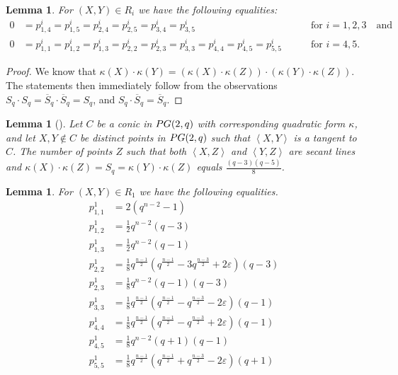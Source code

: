 \documentclass[a4paper]{article}
\newtheorem{lm}[thm]{Lemma}
\theoremstyle{definition}
\newcommand{\eps}{\varepsilon}
\newcommand{\vspan}[1]{\left \langle #1 \right \rangle}
\newcommand{\pg}{\textnormal{PG}}
\newcommand{\ns}{\overline S}
\begin{document}
\begin{lm}
 \label{LmIntersectionNumbersEqualToZero}
    For $(X,Y)\in R_{i}$ we have the following equalities:
    \begin{align*}
        0&=p^{i}_{1,4}=p^{i}_{1,5}=p^{i}_{2,4}=p^{i}_{2,5}=p^{i}_{3,4}=p^{i}_{3,5}&&\text{ for } i=1,2,3\quad \text{and}\\
        0&=p^{i}_{1,1}=p^{i}_{1,2}=p^{i}_{1,3}=p^{i}_{2,2}=p^{i}_{2,3}=p^{i}_{3,3}=p^{i}_{4,4}=p^{i}_{4,5}=p^{i}_{5,5}\quad&&\text{ for } i=4,5.
    \end{align*}
\end{lm}
\begin{proof}
    We know that $\kappa(X)\cdot\kappa(Y)=(\kappa(X)\cdot \kappa(Z))\cdot(\kappa(Y)\cdot\kappa(Z))$. The statements then immediately follow from the observations $S_q \cdot S_q = \ns_q \cdot \ns_q = S_q$, and $S_q \cdot \ns_q = \ns_q$.
\end{proof}

\begin{lm}[{\cite[\S 12.2, p.\ 380]{bcn}}]
 \label{lem:p122}
    Let $C$ be a conic in $\pg(2,q)$ with corresponding quadratic form $\kappa$, and let $X,Y\notin C$ be distinct points in $\pg(2,q)$ such that $\vspan{X,Y}$ is a tangent to $C$. The number of points $Z$ such that both $\vspan{X,Z}$ and $\vspan{Y,Z}$ are secant lines and $\kappa(X)\cdot\kappa(Z)=S_{q}=\kappa(Y)\cdot\kappa(Z)$ equals $\frac{(q-3)(q-5)}{8}$.
\end{lm}

\begin{lm}
 \label{lem:R1relations}
    For $(X,Y)\in R_{1}$ we have the following equalities.
    {\allowdisplaybreaks \begin{align*}
        p^{1}_{1,1}&=2(q^{n-2}-1)\\
        p^{1}_{1,2}&=\frac{1}{2}q^{n-2}(q-3)\\
        p^{1}_{1,3}&=\frac{1}{2}q^{n-2}(q-1)\\
        p^{1}_{2,2}&=\frac{1}{8}q^{\frac{n-1}{2}}\left(q^{\frac{n-1}{2}}-3q^{\frac{n-3}{2}}+2\eps\right)(q-3)\\
        p^{1}_{2,3}&=\frac{1}{8}q^{n-2}(q-1)(q-3)\\
        p^{1}_{3,3}&=\frac{1}{8}q^{\frac{n-1}{2}}\left(q^{\frac{n-1}{2}}-q^{\frac{n-3}{2}}-2\eps\right)(q-1)\\
        p^{1}_{4,4}&=\frac{1}{8}q^{\frac{n-1}{2}}\left(q^{\frac{n-1}{2}}-q^{\frac{n-3}{2}}+2\eps\right)(q-1)\\
        p^{1}_{4,5}&=\frac{1}{8}q^{n-2}(q+1)(q-1)\\
        p^{1}_{5,5}&=\frac{1}{8}q^{\frac{n-1}{2}}\left(q^{\frac{n-1}{2}}+q^{\frac{n-3}{2}}-2\eps\right)(q+1)
    \end{align*}}
\end{lm}
\end{document}
